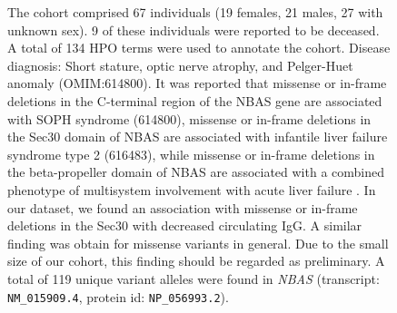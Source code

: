 \begin{figure}[htbp]
\caption{ The cohort comprised 67 individuals (19 females, 21 males, 27 with unknown sex). 9 of these individuals were reported to be deceased. A total of 134 HPO terms were used to annotate the cohort. Disease diagnosis: Short stature, optic nerve atrophy, and Pelger-Huet anomaly (OMIM:614800). It was reported that missense or in-frame deletions in the C-terminal region of the NBAS gene are associated with  SOPH syndrome (614800), 
missense or in-frame deletions in the Sec30 domain of NBAS are associated with infantile liver failure syndrome type 2 (616483), 
while missense or in-frame deletions in the beta-propeller domain of NBAS are associated with a combined phenotype of multisystem involvement with acute liver failure \cite{PMID_38244286}.
In our dataset, we found an association with  missense or in-frame deletions in the Sec30 with decreased circulating IgG. A similar finding was obtain for missense variants in general.
Due to the small size of our cohort, this finding should be regarded as preliminary.
 A total of 119 unique variant alleles were found in \textit{NBAS} (transcript: \texttt{NM\_015909.4}, protein id: \texttt{NP\_056993.2}).}
\end{figure}
